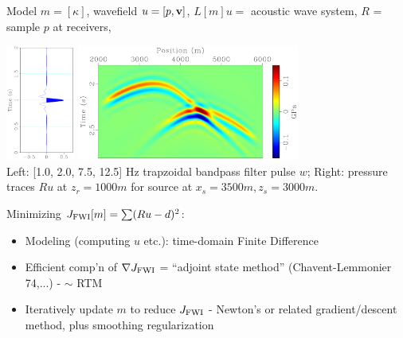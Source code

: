 \documentclass[xcolor=dvipsnames,12pt,aspectratio=169]{beamer}
\begin{document}
\begin{frame}
Model $m=[\kappa]$, wavefield $u=[p,\mathbf{v}]$, $L[m]u=$ acoustic wave system, $R$ = sample $p$ at receivers, 
\begin{center}
\includegraphics[height=1.5in]{Fig/pulse00.pdf} \includegraphics[height=1.5in]{Fig/ptpwindl0.pdf}\\
\vspace{0.25in}
Left: [1.0, 2.0, 7.5, 12.5] Hz trapzoidal bandpass filter pulse $w$; Right: pressure traces $Ru$ at $z_r=1000 m$ for source at $x_s=3500 m, z_s=3000 m$. 
\end{center}
\end{frame}

\begin{frame}
Minimizing $J_{\rm FWI}[m] = \sum (R u - d)^2$:

\begin{itemize}
\item Modeling (computing $u$ etc.): time-domain Finite Difference
\vspace{0,5cm}
\item Efficient comp'n of $\nabla J_{\rm FWI}$ = ``adjoint state method'' (Chavent-Lemmonier 74,...) - $\sim$ RTM
\vspace{0.5cm}
\item Iteratively update $m$ to reduce $J_{\rm FWI}$ - Newton's or related gradient/descent method, plus smoothing regularization
\end{itemize}
\end{frame}
\end{document}
